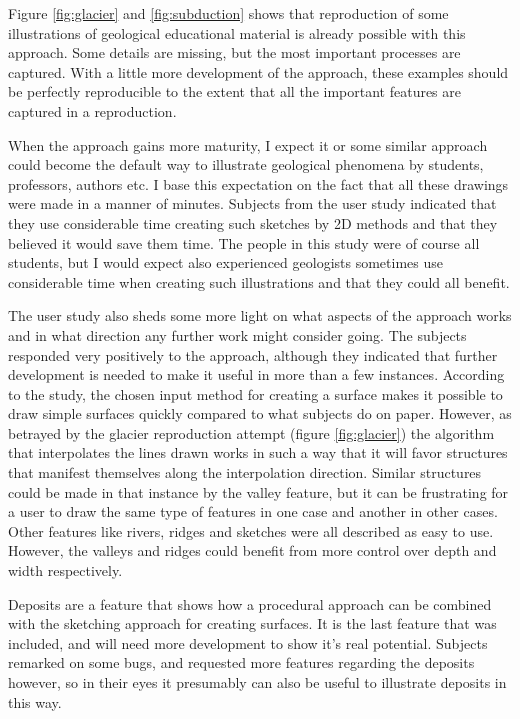 \documentclass[a4paper,12pt]{report}
\begin{document}
Figure \ref{fig:glacier} and \ref{fig:subduction} shows that reproduction of some illustrations of geological educational material is already possible with this approach. Some details are missing, but the most important processes are captured. With a little more development of the approach, these examples should be perfectly reproducible to the extent that all the important features are captured in a reproduction.

When the approach gains more maturity, I expect it or some similar approach could become the default way to illustrate geological phenomena by students, professors, authors etc. I base this expectation on the fact that all these drawings were made in a manner of minutes. Subjects from the user study indicated that they use considerable time creating such sketches by 2D methods and that they believed it would save them time. The people in this study were of course all students, but I would expect also experienced geologists sometimes use considerable time when creating such illustrations and that they  could all benefit.

The user study also sheds some more light on what aspects of the approach works and in what direction any further work might consider going. The subjects responded very positively to the approach, although they indicated that further development is needed to make it useful in more than a few instances. According to the study, the chosen input method for creating a surface makes it possible to draw simple surfaces quickly compared to what subjects do on paper. However, as betrayed by the glacier reproduction attempt (figure \ref{fig:glacier}) the algorithm that interpolates the lines drawn works in such a way that it will favor structures that manifest themselves along the interpolation direction. Similar structures could be made in that instance by the valley feature, but it can be frustrating for a user to draw the same type of features in one case and another in other cases. Other features like rivers, ridges and sketches were all described as easy to use. However, the valleys and ridges could benefit from more control over depth and width respectively. 

Deposits are a feature that shows how a procedural approach can be combined with the sketching approach for creating surfaces. It is the last feature that was included, and will need more development to show it's real potential. Subjects remarked on some bugs, and requested more features regarding the deposits however, so in their eyes it presumably can also be useful to illustrate deposits in this way. 
\end{document}
